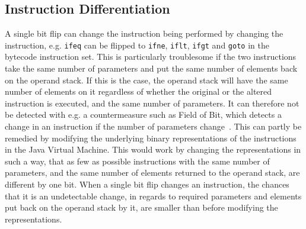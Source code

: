 \subsection{Instruction Differentiation} 
A single bit flip can change the instruction being performed by changing the instruction, e.g. \texttt{ifeq} can be flipped to \texttt{ifne}, \texttt{iflt}, \texttt{ifgt} and \texttt{goto} in the \jc bytecode instruction set. This is particularly troublesome if the two instructions take the same number of parameters and put the same number of elements back on the operand stack. If this is the case, the operand stack will have the same number of elements on it regardless of whether the original or the altered instruction is executed, and the same number of parameters. It can therefore not be detected with e.g. a countermeasure such as Field of Bit, which detects a change in an instruction if the number of parameters change~\cite[p. 16]{javasec}.
This can partly be remedied by modifying the underlying binary representations of the instructions in the Java Virtual Machine.
This would work by changing the representations in such a way, that as few as possible instructions with the same number of parameters, and the same number of elements returned to the operand stack, are different by one bit. 
When a single bit flip changes an instruction, the chances that it is an undetectable change, in regards to required parameters and elements put back on the operand stack by it, are smaller than before modifying the representations.

